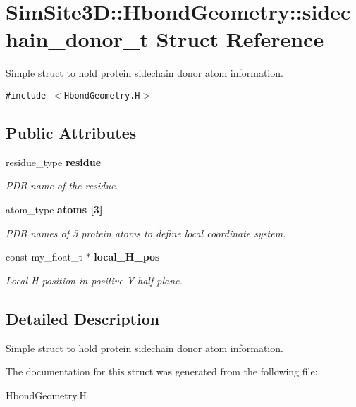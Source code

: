 \section{SimSite3D::Hbond\-Geometry::sidechain\_\-donor\_\-t Struct Reference}
\label{structSimSite3D_1_1HbondGeometry_1_1sidechain__donor__t}
Simple struct to hold protein sidechain donor atom information.  


{\tt \#include $<$Hbond\-Geometry.H$>$}

\subsection*{Public Attributes}
\begin{CompactItemize}
\item 
residue\_\-type \bf{residue}\label{structSimSite3D_1_1HbondGeometry_1_1sidechain__donor__t_9017603a27e92ffaebfd31624dc53a8f}

\begin{CompactList}\small\item\em PDB name of the residue. \item\end{CompactList}\item 
atom\_\-type \bf{atoms} [3]\label{structSimSite3D_1_1HbondGeometry_1_1sidechain__donor__t_763c0e885b56b98b418110042dcfc0a3}

\begin{CompactList}\small\item\em PDB names of 3 protein atoms to define local coordinate system. \item\end{CompactList}\item 
const my\_\-float\_\-t $\ast$ \bf{local\_\-H\_\-pos}\label{structSimSite3D_1_1HbondGeometry_1_1sidechain__donor__t_2fe0faa36a5df2f8885b102c80a4314e}

\begin{CompactList}\small\item\em Local H position in positive Y half plane. \item\end{CompactList}\end{CompactItemize}


\subsection{Detailed Description}
Simple struct to hold protein sidechain donor atom information. 



The documentation for this struct was generated from the following file:\begin{CompactItemize}
\item 
Hbond\-Geometry.H\end{CompactItemize}
